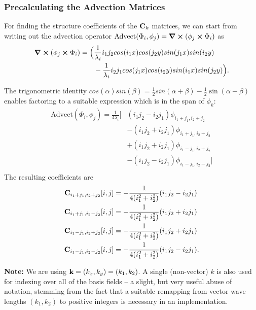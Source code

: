 \subsubsection*{Precalculating the Advection Matrices}
For finding the structure coefficients of the $\vb{C}_k$ matrices, we can start
from writing out the advection operator $\text{Advect}(\Phi_i, \phi_j)
= \curl(\phi_j \cross \Phi_i)$ as
\begin{align*}
\curl(\phi_j \cross \Phi_i) = \Big(
    &\frac{1}{\lambda_i}i_1j_2cos(i_1x)cos(j_2y)sin(j_1x)sin(i_2y)\\
    &-\frac{1}{\lambda_i}i_2j_1cos(j_1x)cos(i_2y)sin(i_1x)sin(j_2y)
\Big).
\end{align*}


The trigonometric identity $cos(\alpha)sin(\beta)
= \frac{1}{2}sin(\alpha+\beta)-\frac{1}{2}\sin(\alpha-\beta)$ enables factoring
to a suitable expression which is in the span of ${\phi_k}$:
\begin{align*}
\text{Advect}(\Phi_i,\phi_j)= \frac{1}{4\lambda_{i}}
    \Big[&(i_1 j_2 - i_2 j_1)\phi_{i_1+j_1, i_2+j_2}\\
     &-(i_1 j_2 + i_2 j_1)\phi_{i_1+j_1, i_2+j_2}\\
     &+(i_1 j_2 + i_2 j_1)\phi_{i_1-j_1, i_2+j_2}\\
     &-(i_1 j_2 - i_2 j_1)\phi_{i_1-j_1, i_2-j_2}\Big]\\
\end{align*}
The resulting coefficients are
\begin{align*}
    \vb{C}_{i_1+j_1,i_2+j_2}[i,j] &= -\frac{1}{4(i_1^2 + i_2^2)}(i_1j_2-i_2j_1)\\
    \vb{C}_{i_1+j_1,i_2-j_2}[i,j] &= -\frac{1}{4(i_1^2 + i_2^2)}(i_1j_2+i_2j_1)\\
    \vb{C}_{i_1-j_1,i_2+j_2}[i,j] &= -\frac{1}{4(i_1^2 + i_2^2)}(i_1j_2+i_2j_1)\\
    \vb{C}_{i_1-j_1,i_2-j_2}[i,j] &= -\frac{1}{4(i_1^2 + i_2^2)}(i_1j_2-i_2j_1).\\
\end{align*}

\textbf{Note:} We are using $\vb{k} = (k_x, k_y) = (k_1, k_2)$. A single
(non-vector) $k$ is also used for indexing over all of the basis fields --
a slight, but very useful abuse of notation, stemming from the fact that
a suitable remapping from vector wave lengths $(k_1, k_2)$ to positive integers
is necessary in an implementation.














